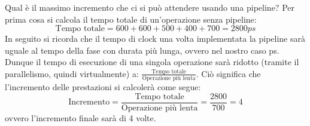 \documentclass[class=book, crop=false, oneside]{standalone}
\begin{document}
Qual è il massimo incremento che ci si può attendere usando una pipeline?
Per prima cosa si calcola il tempo totale di un'operazione senza pipeline:
\begin{equation*}
	\text{Tempo totale} = 600+600+500+400+700 = 2800ps
\end{equation*}
In seguito si ricorda che il tempo di clock una volta implementata la pipeline sarà uguale al tempo della fase con durata più lunga, ovvero nel nostro caso \unit[700]{ps}. Dunque il tempo di esecuzione di una singola operazione sarà ridotto (tramite il parallelismo, quindi virtualmente) a: \(\frac{\text{Tempo totale}}{\text{Operazione più lenta}}\). Ciò significa che l'incremento delle prestazioni si calcolerà come segue:
\begin{equation*}
	\text{Incremento} = \frac{\text{Tempo totale}}{\text{Operazione più lenta}} = \frac{2800}{700} = 4
\end{equation*}
ovvero l'incremento finale sarà di 4 volte.
\end{document}
